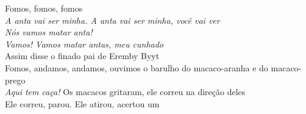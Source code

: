 \begin{linenumbers}\begingroup\raggedright
 
\noindent   Fomos, fomos, fomos\\
  \emph{A anta vai ser minha. A anta vai ser minha, você vai ver}\\
  \emph{Nós vamos matar anta!}\\
  \emph{Vamos! Vamos matar antas, meu cunhado}\\
  Assim disse o finado pai de Eremby Byyt\\
  Fomos, andamos, andamos, ouvimos o barulho do macaco-aranha e do macaco-prego\\
  \emph{Aqui tem caça!} Os macacos gritaram, ele correu na direção deles\\
  Ele correu, parou. Ele atirou, acertou um
 
\end{linenumbers}\endgroup

\bigskip

